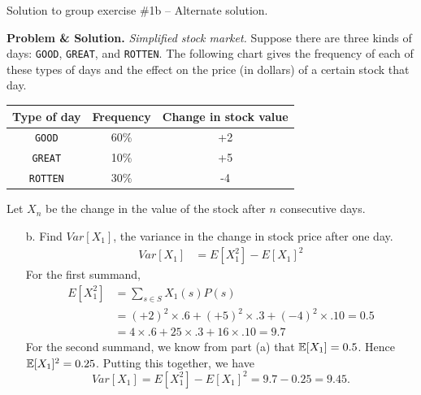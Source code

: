\documentclass[10pt]{beamer}
\begin{document}
\begin{frame}{Solution to group exercise \#1b -- Alternate solution.}
\footnotesize 

\textbf{Problem \& Solution.} \textit{Simplified stock market.} Suppose there are three kinds of days: \texttt{GOOD}, \texttt{GREAT}, and \texttt{ROTTEN}. The following chart gives the frequency of each of these types of days and the effect on the price (in dollars) of a certain stock that day.
	\vspace{-.2cm}
	\begin{table}[H]
	\begin{tabular}{|c|c|c|}
	\toprule 
	\colorbox{blue!30}{Type of day} & 	\colorbox{blue!30}{Frequency} & \colorbox{blue!30}{Change in stock value} \\
	\midrule 
	\texttt{GOOD} & 60\% & +2 \\
	\texttt{GREAT} & 10\% & +5 \\
	\texttt{ROTTEN} & 30\% & -4 \\
	\bottomrule 
	\end{tabular}
	\end{table}
	\vspace{-.2cm}
	Let $X_n$ be the change in the value of the stock after $n$ consecutive days.
		\vspace{-.2cm}
	 \begin{itemize} \footnotesize 
	\item[b.] Find  $Var[X_1]$, the variance in the change in stock price after one day.
	\begin{align*}
	 Var[X_1] &= E[X_1^2] - E[X_1]^2
	 \end{align*}
	For the first summand,  
	\begin{align*}
	E[X_1^2] &= \sum_{s \in S} X_1(s) P(s)  \\
	 &= (+2)^2 \times .6 + 	(+5)^2 \times .3 + (-4)^2 \times .10 = 0.5 \\
	 &= 4 \times .6 + 	25 \times .3 + 16 \times .10 = 9.7 
	 \end{align*}
	 For the second summand, we know  from part (a) that $\mathbb{E}[X_1]=0.5$. Hence $\mathbb{E}[X_1]^2=0.25$.  Putting this together, we have
	 \[  Var[X_1] = E[X_1^2] - E[X_1]^2 = 9.7-0.25 = 9.45.\]
	\end{itemize}
\end{frame}
\end{document}
